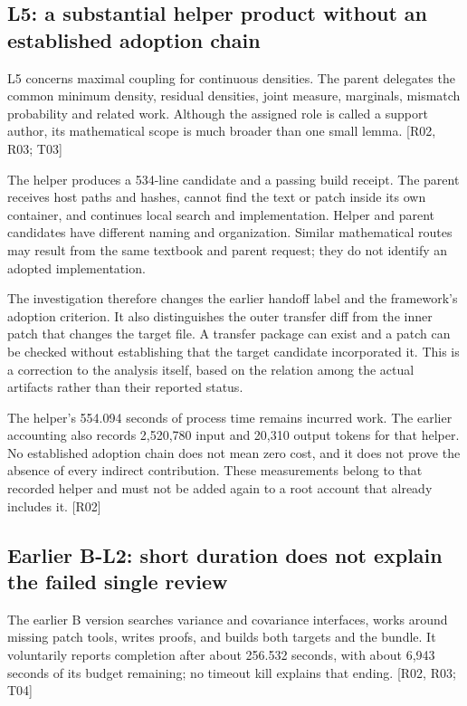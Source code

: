 \subsection[L5: a substantial helper product without an established adoption chain]{\texorpdfstring{\protect\hypertarget{g1}{}L5: a substantial helper product without an established adoption chain}{L5: a substantial helper product without an established adoption chain}}
L5 concerns maximal coupling for continuous densities. The parent delegates the common minimum density, residual densities, joint measure, marginals, mismatch probability and related work. Although the assigned role is called a support author, its mathematical scope is much broader than one small lemma. [R02, R03; T03]

The helper produces a 534-line candidate and a passing build receipt. The parent receives host paths and hashes, cannot find the text or patch inside its own container, and continues local search and implementation. Helper and parent candidates have different naming and organization. Similar mathematical routes may result from the same textbook and parent request; they do not identify an adopted implementation.

The investigation therefore changes the earlier handoff label and the framework's adoption criterion. It also distinguishes the outer transfer diff from the inner patch that changes the target file. A transfer package can exist and a patch can be checked without establishing that the target candidate incorporated it. This is a correction to the analysis itself, based on the relation among the actual artifacts rather than their reported status.

The helper's 554.094 seconds of process time remains incurred work. The earlier accounting also records 2,520,780 input and 20,310 output tokens for that helper. No established adoption chain does not mean zero cost, and it does not prove the absence of every indirect contribution. These measurements belong to that recorded helper and must not be added again to a root account that already includes it. [R02]

\subsection[Earlier B-L2: short duration does not explain the failed single review]{\texorpdfstring{\protect\hypertarget{g2}{}Earlier B-L2: short duration does not explain the failed single review}{Earlier B-L2: short duration does not explain the failed single review}}
The earlier B version searches variance and covariance interfaces, works around missing patch tools, writes proofs, and builds both targets and the bundle. It voluntarily reports completion after about 256.532 seconds, with about 6,943 seconds of its budget remaining; no timeout kill explains that ending. [R02, R03; T04]

